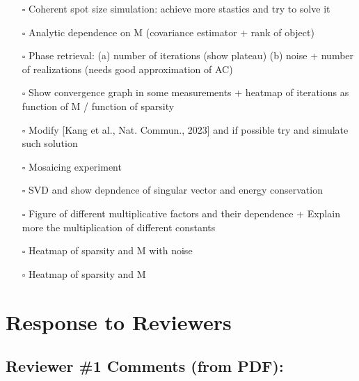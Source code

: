 \documentclass[12pt]{article}
\begin{document}
\begin{itemize}

\item[$\square$]
Coherent spot size simulation: achieve more stastics and try to solve it
\item[$\square$]
Analytic dependence on M (covariance estimator + rank of object) 

\item[$\square$]
Phase retrieval: (a) number of iterations (show plateau) (b) noise + number of realizations (needs good approximation of AC)
\item[$\square$]
Show convergence graph in some measurements + heatmap of iterations as function of M / function of sparsity
\item[$\square$]
Modify [Kang et al., Nat. Commun., 2023] and if possible try and simulate such solution

\item[$\square$]
Mosaicing experiment

\item[$\square$]
SVD and show depndence of singular vector and energy conservation

\item[$\square$]
Figure of different multiplicative factors and their dependence + Explain more the multiplication of different constants 

\item[$\square$]
Heatmap of sparsity and M with noise
\item[\rlap{\raisebox{0.3ex}{\hspace{0.4ex}\scriptsize \ding{51}}}$\square$]
Heatmap of sparsity and M

\end{itemize}
\newpage
\section*{Response to Reviewers}

\subsection*{Reviewer \#1 Comments (from PDF):}
\end{document}
